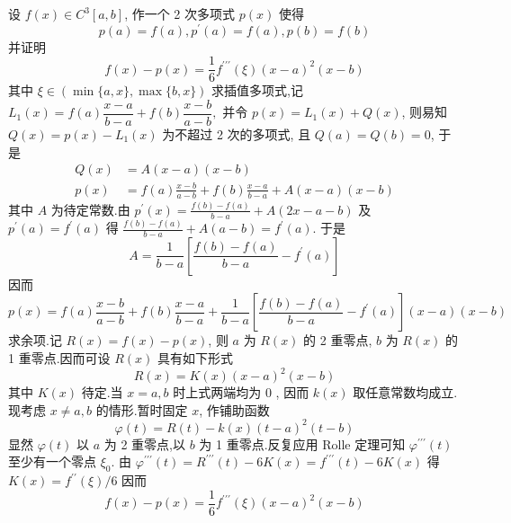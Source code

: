 \begin{tcolorbox}[enhanced,colback=10,colframe=9,breakable,coltitle=green!25!black,title=2024]

设 $ f(x) \in C^{3}[a, b] $, 作一个 2 次多项式 $ p(x) $ 使得
$$
p(a)=f(a), p^{\prime}(a)=f(a), p(b)=f(b)
$$
并证明
$$
f(x)-p(x)=\frac{1}{6} f^{\prime \prime \prime}(\xi)(x-a)^{2}(x-b)
$$
其中 $ \xi \in(\min \{a, x\}, \max \{b, x\}) $
\tcblower
求插值多项式,记
$
L_{1}(x)=f(a) \dfrac{x-a}{b-a}+f(b) \dfrac{x-b}{a-b},
$
并令 $ p(x)=L_{1}(x)+Q(x) $,
则易知 $ Q(x)=p(x)-L_{1}(x) $
为不超过 2 次的多项式, 且 $ Q(a)=Q(b)=0 $,
于是
$$
\begin{aligned}
Q(x) & =A(x-a)(x-b) \\
p(x) & =f(a) \frac{x-b}{a-b}+f(b) \frac{x-a}{b-a}+A(x-a)(x-b)
\end{aligned}
$$
其中 $ A $ 为待定常数.由 $p^{\prime}(x)=\frac{f(b)-f(a)}{b-a}+A(2 x-a-b)$ 及
$p^{\prime}(a)= f^{\prime}(a)$  得 $\frac{f(b)-f(a)}{b-a}+A(a-b)=f^{\prime}(a)$.
于是
$$
A=\frac{1}{b-a}\left[\frac{f(b)-f(a)}{b-a}-f^{\prime}(a)\right]
$$
因而
$$
p(x)=f(a) \frac{x-b}{a-b}+f(b) \frac{x-a}{b-a}+ \frac{1}{b-a}\left[\frac{f(b)-f(a)}{b-a}-f^{\prime}(a)\right](x-a)(x-b)
$$
求余项.记 $R(x)=f(x)-p(x)$, 则 $ a $ 为 $ R(x) $ 的 2 重零点, $ b $ 为 $ R(x) $ 的 1 重零点.因而可设 $ R(x) $ 具有如下形式
$$
R(x)=K(x)(x-a)^{2}(x-b)
$$
其中 $ K(x) $ 待定.当 $ x=a, b $ 时上式两端均为 0 , 因而 $ k(x) $ 取任意常数均成立.现考虑 $ x \neq a, b $ 的情形.暂时固定 $ x $, 作铺助函数
$$
\varphi(t)=R(t)-k(x)(t-a)^{2}(t-b)
$$
显然 $ \varphi(t) $ 以 $ a $ 为 2 重零点,以 $  b $ 为 1 重零点.反复应用 Rolle 定理可知 $ \varphi^{\prime \prime \prime}(t) $ 至少有一个零点 $ \xi_{0} $. 由  $\varphi^{\prime \prime \prime}(t)=R^{\prime \prime \prime}(t)-6 K(x)=f^{\prime \prime \prime}(t)-6 K(x)$ 得 $K(x)=f^{\prime \prime}(\xi) / 6
$
因而
$$
f(x)-p(x)=\frac{1}{6} f^{\prime \prime \prime}(\xi)(x-a)^{2}(x-b)
$$
\end{tcolorbox}